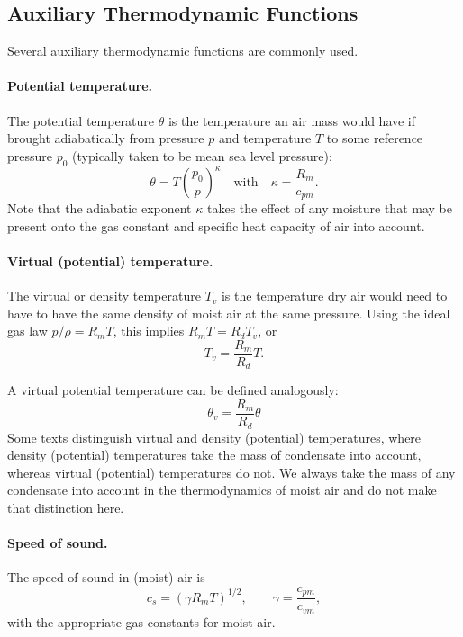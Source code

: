 \documentclass{article}
\begin{document}
\subsection{Auxiliary Thermodynamic Functions}

Several auxiliary thermodynamic functions are commonly used. 

\paragraph{Potential temperature.} The potential temperature $\theta$ is the temperature an air mass would have if brought adiabatically from pressure $p$ and temperature $T$ to some reference pressure $p_0$ (typically taken to be mean sea level pressure):
\begin{equation}
\theta = T \left( \frac{p_0}{p} \right)^\kappa \quad \text{with} \quad \kappa = \frac{R_m}{c_{pm}}.
\end{equation}
Note that the adiabatic exponent $\kappa$ takes the effect of any moisture that may be present onto the gas constant and specific heat capacity of air into account.

\paragraph{Virtual (potential) temperature.} The virtual or density temperature $T_v$ is the temperature dry air would need to have to have the same density of moist air at the same pressure. Using the ideal gas law $p/\rho = R_m T$, this implies $R_m T  = R_d T_v $, or
\begin{equation}
T_v = \frac{R_m}{R_d} T.
\end{equation}

A virtual potential temperature can be defined analogously:
\begin{equation}\label{e:virtual_pottemp}
\theta_v = \frac{R_m}{R_d} \theta
\end{equation}
Some texts distinguish virtual and density (potential) temperatures, where density (potential) temperatures take the mass of condensate into account, whereas virtual (potential) temperatures do not. We always take the mass of any condensate into account in the thermodynamics of moist air and do not make that distinction here. 

\paragraph{Speed of sound.} The speed of sound in (moist) air is 
\begin{equation}\label{e:soundspeed}
 c_s = (\gamma R_m T)^{1/2}, \qquad \gamma = \frac{c_{pm}}{c_{vm}},
\end{equation}
with the appropriate gas constants for moist air.
\end{document}
